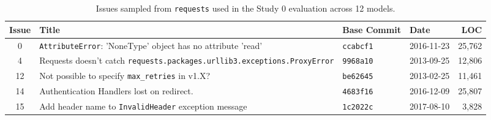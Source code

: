 
\begin{table}[htbp]
\centering
\caption{Issues sampled from \texttt{requests} used in the Study 0 evaluation across 12 models.}
\label{tab:appendix-requests-issues-study0}
\begin{tabular}{@{}c >{\raggedright\arraybackslash}p{6.8cm} l l r@{}}
\toprule
Issue & Title & Base Commit & Date & LOC \\
\midrule
0  & \texttt{AttributeError}: 'NoneType' object has no attribute 'read'          & \texttt{ccabcf1} & 2016-11-23 & 25{,}762 \\
4  & Requests doesn't catch \texttt{requests.\allowbreak{}packages.\allowbreak{}urllib3.\allowbreak{}exceptions.\allowbreak{}ProxyError} & \texttt{9968a10} & 2013-09-25 & 12{,}806 \\
12 & Not possible to specify \texttt{max\_retries} in v1.X?                       & \texttt{be62645} & 2013-02-25 & 11{,}461 \\
14 & Authentication Handlers lost on redirect.                                    & \texttt{4683f16} & 2016-12-09 & 25{,}807 \\
15 & Add header name to \texttt{InvalidHeader} exception message                  & \texttt{1c2022c} & 2017-08-10 & 3{,}828  \\
\bottomrule
\end{tabular}
\end{table}
